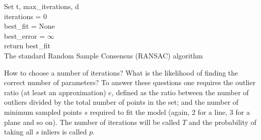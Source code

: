 \documentclass[../main.tex]{subfiles}
\begin{document}
\begin{algorithm}[h]
    \SetAlgoLined
    Set t, max\_iterations, d\\
    iterations = 0\\
    best\_fit = None\\
    best\_error = $\infty$\\
    return best\_fit\\
    \caption{The standard Random Sample Consensus (RANSAC) algorithm}
    \label{lst:ransac_algo}
\end{algorithm}

How to choose a number of iterations? What is the likelihood of finding the correct number of parameters? To answer these questions one requires the outlier ratio (at least an approximation) $e$, defined as the ratio between the number of outliers divided by the total number of points in the set; and the number of minimum sampled points $s$ required to fit the model (again, 2 for a line, 3 for a plane and so on). The number of iterations will be called $T$ and the probability of taking all $s$ inliers is called $p$.  
\end{document}
